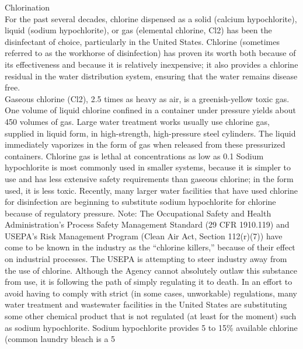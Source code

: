 Chlorination\\
For the past several decades, chlorine dispensed as a solid (calcium hypochlorite), liquid (sodium hypochlorite), or gas (elemental chlorine, Cl2) has been the disinfectant of choice, particularly in the United States. Chlorine (sometimes referred to as the workhorse of disinfection) has proven its worth both because of its effectiveness and because it is relatively inexpensive; it also provides a chlorine residual in the water distribution system, ensuring that the water remains disease free.\\
Gaseous chlorine (Cl2), 2.5 times as heavy as air, is a greenish-yellow toxic gas. One volume of liquid chlorine confined in a container under pressure yields about 450 volumes of gas. Large water treatment works usually use chlorine gas, supplied in liquid form, in high-strength, high-pressure steel cylinders. The liquid immediately vaporizes in the form of gas when released from these pressurized containers. Chlorine gas is lethal at concentrations as low as 0.1%
Sodium hypochlorite is most commonly used in smaller systems, because it is simpler to use and has less extensive safety requirements than gaseous chlorine; in the form used, it is less toxic. Recently, many larger water facilities that have used chlorine for disinfection are beginning to substitute sodium hypochlorite for chlorine because of regulatory pressure.
Note: The Occupational Safety and Health Administration’s Process Safety Management Standard (29 CFR 1910.119) and USEPA’s Risk Management Program (Clean Air Act, Section 112(r)(7)) have come to be known in the industry as the “chlorine killers,” because of their effect on industrial processes. The USEPA is attempting to steer industry away from the use of chlorine. Although the Agency cannot absolutely outlaw this substance from use, it is following the path of simply regulating it to death. In an effort to avoid having to comply with strict (in some cases, unworkable) regulations, many water treatment and wastewater facilities in the United States are substituting some other chemical product that is not regulated (at least for the moment) such as sodium hypochlorite. Sodium hypochlorite provides 5 to 15\% available chlorine (common laundry bleach is a 5%
